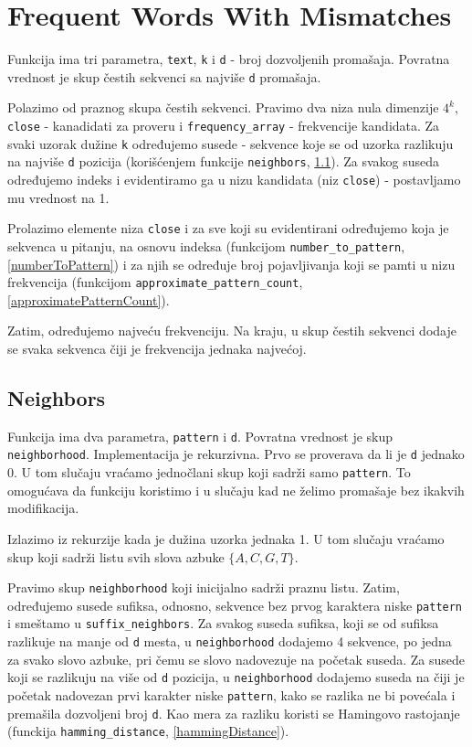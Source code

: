 \section{Frequent Words With Mismatches}

Funkcija ima tri parametra, \texttt{text}, \texttt{k} i \texttt{d} - broj dozvoljenih promašaja. Povratna vrednost je skup čestih sekvenci sa najviše \texttt{d} promašaja.

Polazimo od praznog skupa čestih sekvenci. Pravimo dva niza nula dimenzije $4^k$, \texttt{close} - kanadidati za proveru i \texttt{frequency\_array} - frekvencije kandidata. 
Za svaki uzorak dužine \texttt{k} određujemo susede - sekvence koje se od uzorka razlikuju na najviše \texttt{d} pozicija (korišćenjem funkcije \texttt{neighbors}, \ref{neighbors}). Za svakog suseda određujemo indeks i evidentiramo ga u nizu kandidata (niz \texttt{close}) - postavljamo mu vrednost na 1.

Prolazimo elemente niza \texttt{close} i za sve koji su evidentirani određujemo koja je sekvenca u pitanju, na osnovu indeksa (funkcijom \texttt{number\_to\_pattern}, \ref{numberToPattern}) i za njih se određuje broj pojavljivanja koji se pamti u nizu frekvencija (funkcijom \texttt{approximate\_pattern\_count}, \ref{approximatePatternCount}). 

Zatim, određujemo najveću frekvenciju. Na kraju, u skup čestih sekvenci dodaje se svaka sekvenca čiji je frekvencija jednaka najvećoj.




\subsection{Neighbors}
\label{neighbors}

Funkcija ima dva parametra, \texttt{pattern} i \texttt{d}. Povratna vrednost je skup \texttt{neighborhood}. Implementacija je rekurzivna. Prvo se proverava da li je \texttt{d} jednako 0. U tom slučaju vraćamo jednočlani skup koji sadrži samo \texttt{pattern}. To omogućava da funkciju koristimo i u slučaju kad ne želimo promašaje bez ikakvih modifikacija.

Izlazimo iz rekurzije kada je dužina uzorka jednaka 1. U tom slučaju vraćamo skup koji sadrži listu svih slova azbuke $\{A, C, G, T\}$. 

Pravimo skup \texttt{neighborhood} koji inicijalno sadrži praznu listu. Zatim, određujemo susede sufiksa, odnosno, sekvence bez prvog karaktera niske \texttt{pattern} i smeštamo u \texttt{suffix\_neighbors}. Za svakog suseda sufiksa, koji se od sufiksa razlikuje na manje od \texttt{d} mesta, u \texttt{neighborhood} dodajemo 4 sekvence, po jedna za svako slovo azbuke, pri čemu se slovo nadovezuje na početak suseda. Za susede koji se razlikuju na više od \texttt{d} pozicija, u \texttt{neighborhood} dodajemo suseda na čiji je početak nadovezan prvi karakter niske \texttt{pattern}, kako se razlika ne bi povećala i premašila dozvoljeni broj \texttt{d}. Kao mera za razliku koristi se Hamingovo rastojanje (funckija \texttt{hamming\_distance}, \ref{hammingDistance}).



